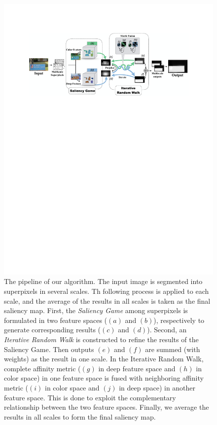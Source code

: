 \documentclass[journal]{IEEEtran}
\begin{document}
\begin{figure}
\setlength{\abovedisplayskip}{0pt}
\setlength{\belowdisplayskip}{0pt}
\begin{center}
 \includegraphics[width=1\linewidth]{figure2.pdf}
\end{center}
\vspace{-10pt}
   \caption{\small{The pipeline of our algorithm. The input image is segmented into superpixels in several scales. Th following process is applied to each scale, and the average of the results in all scales is taken as the final saliency map. First, the \textit{Saliency Game} among superpixels is formulated in two feature spaces ($(a)$ and $(b)$), respectively to generate corresponding results ($(c)$ and $(d)$).
   Second, an \textit{Iterative Random Walk} is constructed to refine the results of the Saliency Game. Then outputs $(e)$ and $(f)$ are summed (with weights) as the result in one scale. In the Iterative Random Walk, complete affinity metric ($(g)$ in deep feature space and $(h)$ in color space) in one feature space is fused with neighboring affinity metric ($(i)$ in color space and $(j)$ in deep space) in another feature space. This is done to exploit the complementary relationship between the two feature spaces. Finally, we average the results in all scales to form the final saliency map. 
}}
\label{fig:2}
\end{figure}
\end{document}
